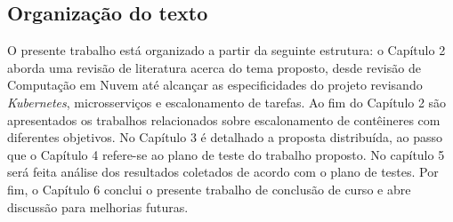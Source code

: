 \newpage
\subsection{Organização do texto}

O presente trabalho está organizado a partir da seguinte estrutura: o Capítulo 2 aborda uma revisão de literatura acerca do tema proposto, desde revisão de Computação em Nuvem até alcançar as especificidades do projeto revisando \textit{Kubernetes}, microsserviços e escalonamento de tarefas. Ao fim do Capítulo 2 são apresentados os trabalhos relacionados sobre escalonamento de contêineres com diferentes objetivos. No Capítulo 3 é detalhado a proposta distribuída, ao passo que o Capítulo 4 refere-se ao plano de teste do trabalho proposto. No capítulo 5 será feita análise dos resultados coletados de acordo com o plano de testes. Por fim, o Capítulo 6 conclui o presente trabalho de conclusão de curso e abre discussão para melhorias futuras. 